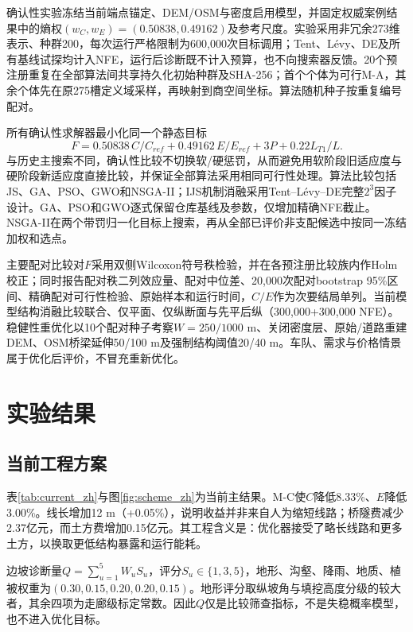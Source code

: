 \documentclass[preprint,12pt]{elsarticle}
\begin{document}
确认性实验冻结当前端点锚定、DEM/OSM与密度启用模型，并固定权威案例结果中的熵权$(w_C,w_E)=(0.50838,0.49162)$及参考尺度。实验采用非冗余273维表示、种群200，每次运行严格限制为600,000次目标调用；Tent、L\'evy、DE及所有基线试探均计入NFE，运行后诊断既不计入预算，也不向搜索器反馈。20个预注册重复在全部算法间共享持久化初始种群及SHA-256；首个个体为可行M-A，其余个体先在原275槽定义域采样，再映射到商空间坐标。算法随机种子按重复编号配对。

所有确认性求解器最小化同一个静态目标
\begin{equation}
F=0.50838\,C/C_{ref}+0.49162\,E/E_{ref}+3P+0.22L_{T1}/L.
\end{equation}
与历史主搜索不同，确认性比较不切换软/硬惩罚，从而避免用软阶段旧适应度与硬阶段新适应度直接比较，并保证全部算法采用相同可行性处理。算法比较包括JS、GA、PSO、GWO和NSGA-II；IJS机制消融采用Tent--L\'evy--DE完整$2^3$因子设计。GA、PSO和GWO逐式保留仓库基线及参数，仅增加精确NFE截止。NSGA-II在两个带罚归一化目标上搜索，再从全部已评价非支配候选中按同一冻结加权和选点。

主要配对比较对$F$采用双侧Wilcoxon符号秩检验，并在各预注册比较族内作Holm校正；同时报告配对秩二列效应量、配对中位差、20,000次配对bootstrap 95\%区间、精确配对可行性检验、原始样本和运行时间，$C/E$作为次要结局单列。当前模型结构消融比较联合、仅平面、仅纵断面与先平后纵（300,000+300,000 NFE）。稳健性重优化以10个配对种子考察$W=250/1000$ m、关闭密度层、原始/道路重建DEM、OSM桥梁延伸50/100 m及强制结构阈值20/40 m。车队、需求与价格情景属于优化后评价，不冒充重新优化。

\section{实验结果}

\subsection{当前工程方案}

表\ref{tab:current_zh}与图\ref{fig:scheme_zh}为当前主结果。M-C使$C$降低8.33\%、$E$降低3.00\%。线长增加12 m（+0.05\%），说明收益并非来自人为缩短线路；桥隧费减少2.37亿元，而土方费增加0.15亿元。其工程含义是：优化器接受了略长线路和更多土方，以换取更低结构暴露和运行能耗。

边坡诊断量$Q=\sum_{u=1}^{5}W_uS_u$，评分$S_u\in\{1,3,5\}$，地形、沟壑、降雨、地质、植被权重为$(0.30,0.15,0.20,0.20,0.15)$。地形评分取纵坡角与填挖高度分级的较大者，其余四项为走廊级标定常数。因此$Q$仅是比较筛查指标，不是失稳概率模型，也不进入优化目标。
\end{document}

